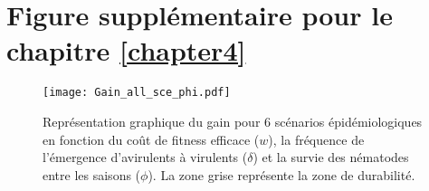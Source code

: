 \section{Figure supplémentaire pour le chapitre \ref{chapter4}}  \label{secan4}

		\begin{figure}[H]
		\centering
			\texttt{[image: Gain\_all\_sce\_phi.pdf]}
			\caption[Gain relatif  
			en fonction de 6 scénarios épidémiologique, du coût de fitness efficace, la fréquence de l'émergence 
			d'avirulents à virulents et la survie intersaison.]{Représentation graphique du gain pour 6 scénarios 
			épidémiologiques en fonction du coût de fitness efficace ($w$), la fréquence de l'émergence d'avirulents à 
			virulents ($\delta$) et la survie des nématodes entre les saisons ($\phi$). La zone grise représente
			la zone de durabilité.}
		\label{survie_annexe} 
		\end{figure}



